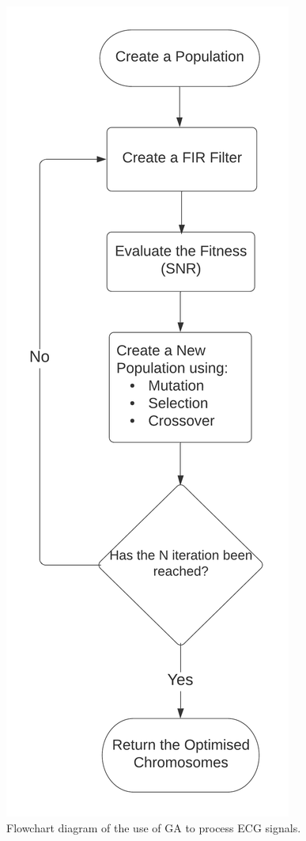 \documentclass[a4paper, 11pt]{article}
\begin{document}
    \begin{figure}[h!]
        \centering
        \graphicspath{{./wiki/}}
        \includegraphics[scale=0.8]{Flowchart.png}
        \caption{Flowchart diagram of the use of GA to process ECG signals.}
        \label{Fig:flowchart}
    \end{figure}
\end{document}
